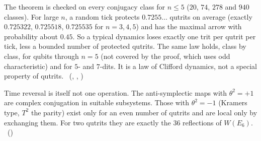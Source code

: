 The theorem is checked on every conjugacy class for $n\le5$ ($20$, $74$, $278$ and $940$ classes). For large $n$, a
random tick protects $0.7255\ldots$ qutrits on average (exactly $0.725322$, $0.725518$, $0.725535$ for $n=3,4,5$) and
has the maximal arrow with probability about $0.45$. So a typical dynamics loses exactly one trit per qutrit per tick, less a bounded number of protected qutrits.
The same law holds, class by class, for qubits through $n=5$ (not covered by the proof, which uses odd characteristic)
and for $5$- and $7$-dits. It is a law of Clifford dynamics, not a special property of qutrits.
\tierC\ (, ,
)

Time reversal is itself not one operation. The anti-symplectic maps with $\theta^2=+1$ are complex conjugation in
suitable subsystems. Those with $\theta^2=-1$ (Kramers type, $T^2$ the parity) exist only for an even number of qutrits
and are local only by exchanging them. For two qutrits they are exactly the $36$ reflections of $W(E_6)$.
\tierC\ ()
